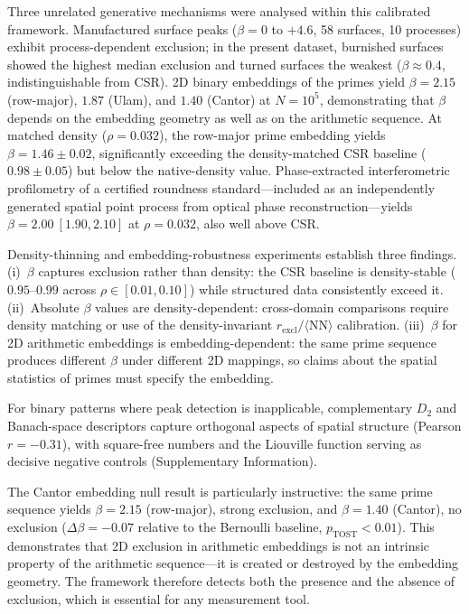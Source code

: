 \documentclass[final,3p,times,twocolumn]{elsarticle}
\theoremstyle{definition}
\begin{document}
Three unrelated generative mechanisms were analysed within this calibrated
framework. Manufactured surface peaks ($\beta = 0$ to $+4.6$, 58 surfaces,
10 processes) exhibit process-dependent exclusion; in the present dataset,
burnished surfaces showed the highest median exclusion and turned surfaces
the weakest ($\beta \approx 0.4$, indistinguishable from CSR).
2D binary embeddings of the primes yield $\beta = 2.15$ (row-major),
$1.87$ (Ulam), and $1.40$ (Cantor) at $N=10^5$, demonstrating that
$\beta$ depends on the embedding geometry as well as on the arithmetic
sequence. At matched density ($\rho = 0.032$), the row-major prime
embedding yields $\beta = 1.46\pm0.02$, significantly exceeding the
density-matched CSR baseline ($0.98\pm0.05$) but below the native-density
value. Phase-extracted interferometric profilometry of a certified roundness
standard---included as an independently generated spatial point process from
optical phase reconstruction---yields $\beta = 2.00~[1.90,2.10]$ at
$\rho = 0.032$, also well above CSR.

Density-thinning and embedding-robustness experiments establish three
findings. (i)~$\beta$ captures exclusion rather than density: the CSR
baseline is density-stable ($0.95$--$0.99$ across $\rho \in [0.01, 0.10]$)
while structured data consistently exceed it. (ii)~Absolute $\beta$ values
are density-dependent: cross-domain comparisons require density matching or
use of the density-invariant $r_{\text{excl}}/\langle\text{NN}\rangle$
calibration. (iii)~$\beta$ for 2D arithmetic embeddings is
embedding-dependent: the same prime sequence produces different $\beta$
under different 2D mappings, so claims about the spatial statistics of
primes must specify the embedding.

For binary patterns where peak detection is inapplicable, complementary $D_2$
and Banach-space descriptors capture orthogonal aspects of spatial structure
(Pearson $r = -0.31$), with square-free numbers and the Liouville function
serving as decisive negative controls (Supplementary Information).

The Cantor embedding null result is particularly instructive:
the same prime sequence yields $\beta=2.15$ (row-major), strong
exclusion, and $\beta=1.40$ (Cantor), no exclusion
($\Delta\beta=-0.07$ relative to the Bernoulli baseline,
$p_{\text{TOST}}<0.01$). This demonstrates that 2D exclusion in
arithmetic embeddings is not an intrinsic property of the arithmetic
sequence---it is created or destroyed by the embedding geometry. The
framework therefore detects both the presence and the absence of
exclusion, which is essential for any measurement tool.
\end{document}
